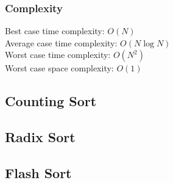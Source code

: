 \documentclass[11pt,a4paper]{article}
\begin{document}
\subsubsection*{Complexity}
Best case time complexity: $O(N)$ \\
Average case time complexity: $O(N \log N)$\\
Worst case time complexity: $O(N^2)$ \\
Worst case space complexity: $O(1)$

\subsection{Counting Sort}
\subsection{Radix Sort}
\subsection{Flash Sort}
\end{document}
